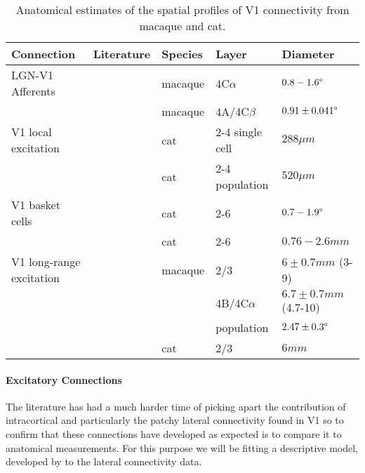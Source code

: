 \begin{table}
  \centering
  \begin{adjustbox}{width=1\textwidth}
  \begin{tabular}{l | l l l l}
    Connection               & Literature            & Species & Layer & Diameter \\
    \hline
    LGN-V1 Afferents         & \cite{Angelucci2002c} & macaque & 4C$\alpha$ & $0.8-1.6\degree$ \\
                             & \cite{Angelucci2006a} & macaque & 4A/4C$\beta$ & $0.91 \pm 0.041\degree$ \\
    \hline
    V1 local excitation      & \cite{Buzas2006}      & cat      & 2-4 single cell & $288 \mu m$ \\
                             & \cite{Buzas2006}      & cat      & 2-4 population  & $520 \mu m$ \\
    \hline
    V1 basket cells          & \cite{Buzas2001}      & cat      & 2-6 & $0.7-1.9\degree$ \\
                             & \cite{Buzas2001}      & cat      & 2-6 & $0.76-2.6 mm$ \\
    \hline
    V1 long-range excitation & \cite{Angelucci2002}  & macaque  & 2/3 & $6\pm 0.7 mm$ (3-9) \\
                             &                       &          & 4B/4C$\alpha$ & $6.7 \pm 0.7 mm$ (4.7-10) \\
                             &                       &          & population & $2.47 \pm 0.3\degree$ \\
                             & \cite{Buzas2006}      & cat      & 2/3 & $6 mm$ \\
    \hline
  \end{tabular}
  \end{adjustbox}
  \caption{Anatomical estimates of the spatial profiles of V1
    connectivity from macaque and cat.}
  \label{anatomicaltable}
\end{table}


\paragraph{Excitatory Connections}

The literature has had a much harder time of picking apart the
contribution of intracortical and particularly the patchy lateral
connectivity found in V1 so to confirm that these connections have
developed as expected is to compare it to anatomical measurements.
For this purpose we will be fitting a descriptive model, developed by
\cite{Buzas2006} to the lateral connectivity data.

